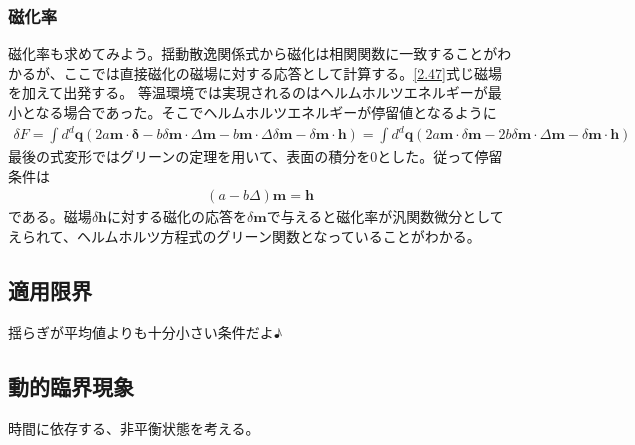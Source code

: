 \documentclass[autodetect-engine,dvipdfmx-if-dvi,ja=standard]{bxjsarticle}
\theoremstyle{break}
\begin{document}
            \subsubsection{磁化率}
                磁化率も求めてみよう。揺動散逸関係式から磁化は相関関数に一致することがわかるが、ここでは直接磁化の磁場に対する応答として計算する。\eqref{2.47}式じ磁場を加えて出発する。
                等温環境では実現されるのはヘルムホルツエネルギーが最小となる場合であった。そこでヘルムホルツエネルギーが停留値となるように
                \begin{align}
                    \delta F=\int d^d\bm{q}(2a\bm{m}\cdot\bm{\delta}-b\delta \bm{m}\cdot \Delta \bm{m}-b \bm{m}\cdot \Delta \delta\bm{m}-\delta \bm{m}\cdot\bm{h})=\int d^d\bm{q}(2a\bm{m}\cdot\delta\bm{m}-2b\delta \bm{m}\cdot \Delta \bm{m}-\delta \bm{m}\cdot\bm{h})
                \end{align}
                最後の式変形ではグリーンの定理を用いて、表面の積分を$0$とした。従って停留条件は
                \begin{align}
                    (a-b\Delta) \bm{m}=\bm{h}
                \end{align}
                である。磁場$\delta \bm{h}$に対する磁化の応答を$\delta\bm{m}$で与えると磁化率が汎関数微分としてえられて、ヘルムホルツ方程式のグリーン関数となっていることがわかる。　
        \subsection{適用限界}
            揺らぎが平均値よりも十分小さい条件だよ♪
        \subsection{動的臨界現象}
            時間に依存する、非平衡状態を考える。
\end{document}
